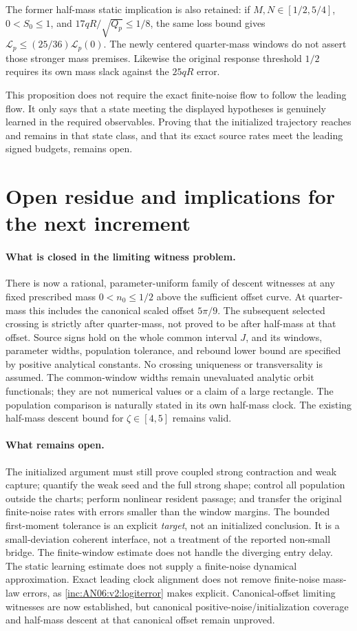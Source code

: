\documentclass[11pt]{article}
\numberwithin{equation}{section}
\theoremstyle{remark}\newtheorem{remark}[theorem]{Remark}
\newcommand{\1}{\mathbf 1}
\begin{document}
The former half-mass static implication is also retained: if
$M,N\in[1/2,5/4]$, $0<S_0\le1$, and
$17qR/\sqrt{Q_p}\le1/8$, the same loss bound gives
$\mathcal L_p\le(25/36)\mathcal L_p(0)$.
The newly centered quarter-mass windows do not assert those stronger mass
premises. Likewise the original response threshold $1/2$ requires its
own mass slack against the $25qR$ error.

This proposition does not require the exact finite-noise flow to follow
the leading flow. It only says that a state meeting the displayed
hypotheses is genuinely learned in the required observables. Proving that
the initialized trajectory reaches and remains in that state class, and
that its exact source rates meet the leading signed budgets, remains open.

\section{Open residue and implications for the next increment}
\label{inc:AN06:v2:residue}
\paragraph{What is closed in the limiting witness problem.}
There is now a rational, parameter-uniform family of descent witnesses at
any fixed prescribed mass $0<n_0\le1/2$ above the sufficient offset curve.
At quarter-mass this includes the canonical scaled offset $5\pi/9$.
The subsequent selected crossing is strictly after quarter-mass, not
proved to be after half-mass at that offset. Source signs hold on the
whole common interval $J$, and its windows, parameter widths, population
tolerance, and rebound lower bound are specified by positive analytical
constants. No crossing uniqueness or transversality is assumed.
The common-window widths remain unevaluated analytic orbit functionals;
they are not numerical values or a claim of a large rectangle.
The population comparison is naturally stated in its own half-mass clock.
The existing half-mass descent bound for $\zeta\in[4,5]$ remains valid.

\paragraph{What remains open.}
The initialized argument must still prove coupled strong contraction and
weak capture; quantify the weak seed and the full strong shape;
control all population outside the charts; perform nonlinear resident
passage; and transfer the original finite-noise rates with errors smaller
than the window margins. The bounded first-moment tolerance is an explicit
\emph{target}, not an initialized conclusion. It is a small-deviation
coherent interface, not a treatment of the reported non-small bridge.
The finite-window estimate does not handle the diverging entry delay.
The static learning estimate does not supply a finite-noise dynamical
approximation. Exact leading clock alignment does not remove finite-noise
mass-law errors, as \eqref{inc:AN06:v2:logiterror} makes explicit.
Canonical-offset limiting witnesses are now established, but canonical
positive-noise/initialization coverage and half-mass descent at that
canonical offset remain unproved.
\end{document}
